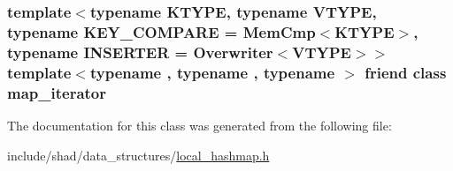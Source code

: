 \hypertarget{classshad_1_1LocalHashmap_ae4a075e5a8191685a74f2d18b8cd8850}{
\subsubsection[{map\-\_\-iterator}]{\setlength{\rightskip}{0pt plus 5cm}template$<$typename K\-T\-Y\-P\-E, typename V\-T\-Y\-P\-E, typename K\-E\-Y\-\_\-\-C\-O\-M\-P\-A\-R\-E = Mem\-Cmp$<$\-K\-T\-Y\-P\-E$>$, typename I\-N\-S\-E\-R\-T\-E\-R = Overwriter$<$\-V\-T\-Y\-P\-E$>$$>$ template$<$typename , typename , typename $>$ friend class {\bf map\-\_\-iterator}\hspace{0.3cm}{\ttfamily [friend]}}}\label{classshad_1_1LocalHashmap_ae4a075e5a8191685a74f2d18b8cd8850}


The documentation for this class was generated from the following file\-:\begin{DoxyCompactItemize}
\item 
include/shad/data\-\_\-structures/\hyperlink{local__hashmap_8h}{local\-\_\-hashmap.\-h}\end{DoxyCompactItemize}
